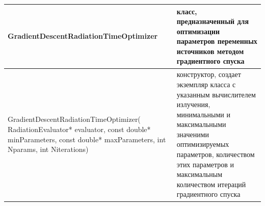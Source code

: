 \begin{small}
\begin{xtabular}{|p{0.5\textwidth}|p{0.5\textwidth}|}
		\hline
		\textbf{GradientDescentRadiationTimeOptimizer} & класс, предназначенный для оптимизации параметров переменных источников методом градиентного спуска\\
		\hline
		GradientDescentRadiationTimeOptimizer( RadiationEvaluator* evaluator, const double* minParameters, const double* maxParameters, int Nparams, int Niterations) & конструктор, создает экземпляр класса с указанным вычислителем излучения, минимальными и максимальными значеними оптимизируемых параметров, количеством этих параметров и максимальным количеством итераций градиентного спуска\\
		\hline		
\end{xtabular}
\end{small}